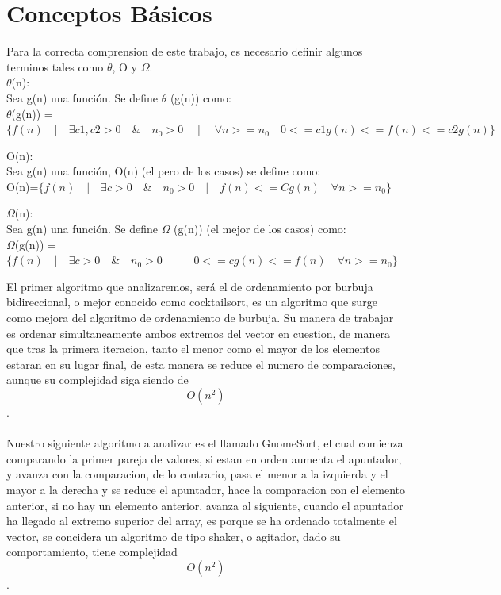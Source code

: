 \documentclass[spanish]{article}
\begin{document}
\newpage
	\section{Conceptos B\'asicos}
	Para la correcta comprension de este trabajo, es necesario definir algunos terminos tales como $\theta$, O y $\Omega$.\\
	 $\theta$(n):\\
		Sea g(n) una función. Se define  $\theta$ (g(n)) como:\\
		
		 	$\theta$(g(n)) = $\{ f(n) \quad | \quad \exists c1,c2>0 \quad \& \quad n_{0}>0 \quad \mid \quad \forall n>=n_{0} \quad 0<= c1g(n) <= f(n) <= c2g(n) \}$
	\bigskip		 	
		 	
	O(n):\\
		Sea  g(n)  una función, O(n) (el pero de los casos) se define como:\\
		
			\hspace{1cm}O(n)=$\{f(n) \quad | \quad \exists c >0 \quad \& \quad n_{0}>0 \quad | \quad f(n) <= Cg(n) \quad \forall  n>= n_{0} \}$
	\bigskip
	
	$\Omega$(n):\\
	Sea  g(n)  una función. Se define $\Omega$ (g(n)) (el mejor de los casos) como:\\

		\hspace{1cm}$\Omega$(g(n)) =$\{f(n) \quad | \quad \exists c >0 \quad \& \quad n_{0}>0 \quad \mid \quad  0<= cg(n)<= f(n) \quad \forall n>= n_{0} \}$
	\bigskip
	
	El primer algoritmo que analizaremos, será el de ordenamiento por burbuja bidireccional, o mejor conocido como cocktailsort, es un algoritmo que surge como mejora del algoritmo de ordenamiento de burbuja. Su manera de trabajar es ordenar simultaneamente ambos extremos del vector en cuestion, de manera que tras la primera iteracion, tanto el menor como el mayor de los elementos estaran en su lugar final, de esta manera se reduce el numero de comparaciones, aunque su complejidad siga siendo de $$O(n^2)$$.\\\\

	Nuestro siguiente algoritmo a analizar es el llamado GnomeSort, el cual comienza comparando la primer pareja de valores, si estan en orden aumenta el apuntador, y avanza con la comparacion, de lo contrario, pasa el menor a la izquierda y el mayor a la derecha y se reduce el apuntador, hace la comparacion con el elemento anterior, si no hay un elemento anterior, avanza al siguiente, cuando el apuntador ha llegado al extremo superior del array, es porque se ha ordenado totalmente el vector, se concidera un algoritmo de tipo shaker, o agitador, dado su comportamiento, tiene complejidad $$O(n^2)$$.\\\\
\end{document}
